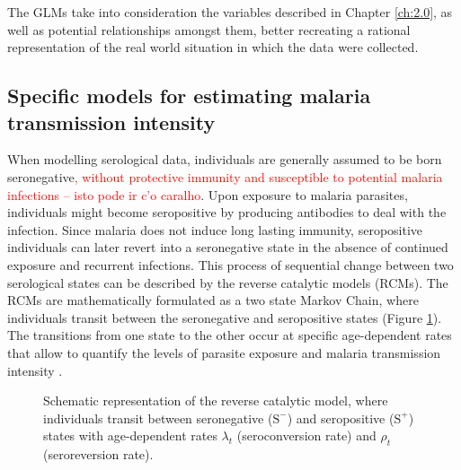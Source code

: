 The GLMs take into consideration the variables described in Chapter \ref{ch:2.0}, as well as potential relationships amongst them, better recreating a rational representation of the real world situation in which the data were collected.



\subsection{Specific models for estimating malaria transmission intensity}

When modelling serological data, individuals are generally assumed to be born seronegative\textcolor{red}{, without protective immunity and susceptible to potential malaria infections -- isto pode ir c'o caralho}.
Upon exposure to malaria parasites, individuals might become seropositive by producing antibodies to deal with the infection.
Since malaria does not induce long lasting immunity, seropositive individuals can later revert into a seronegative state in the absence of continued exposure and recurrent infections.
This process of sequential change between two serological states can be described by the reverse catalytic models (RCMs).
The RCMs are mathematically formulated as a two state Markov Chain, where individuals transit between the seronegative and seropositive states (Figure \ref{fig:M0}).
The transitions from one state to the other occur at specific age-dependent rates that allow to quantify the levels of parasite exposure and malaria transmission intensity \cite{muench1959catalytic}.

\begin{figure}[ht!]
    \center
    \scalebox{1.25}{}
    \caption[Reverse catalytic model with constant transition parameters]{Schematic representation of the reverse catalytic model, where individuals transit between seronegative ($\text{S}^-$) and seropositive ($\text{S}^+$) states with age-dependent rates $\lambda_t$ (seroconversion rate) and $\rho_t$ (seroreversion rate).}
    \label{fig:M0}
\end{figure}


